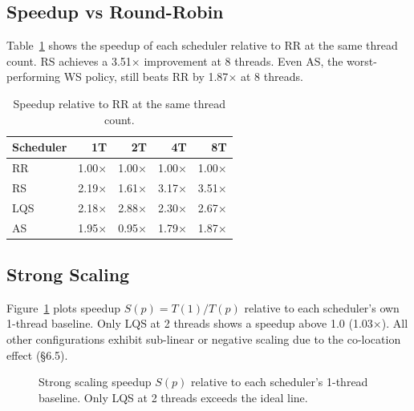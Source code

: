 \documentclass[conference]{IEEEtran}
\begin{document}
\subsection{Speedup vs Round-Robin}

Table~\ref{tab:speedup_rr} shows the speedup of each scheduler relative to RR at the same thread count. RS achieves a 3.51$\times$ improvement at 8 threads. Even AS, the worst-performing WS policy, still beats RR by 1.87$\times$ at 8 threads.

\begin{table}[htbp]
\centering
\caption{Speedup relative to RR at the same thread count.}
\label{tab:speedup_rr}
\begin{tabular}{lrrrr}
\toprule
Scheduler & 1T    & 2T    & 4T    & 8T    \\
\midrule
RR  & 1.00$\times$ & 1.00$\times$ & 1.00$\times$ & 1.00$\times$ \\
RS  & 2.19$\times$ & 1.61$\times$ & 3.17$\times$ & 3.51$\times$ \\
LQS & 2.18$\times$ & 2.88$\times$ & 2.30$\times$ & 2.67$\times$ \\
AS  & 1.95$\times$ & 0.95$\times$ & 1.79$\times$ & 1.87$\times$ \\
\bottomrule
\end{tabular}
\end{table}

\subsection{Strong Scaling}

Figure~\ref{fig:strong} plots speedup $S(p) = T(1)/T(p)$ relative to each scheduler's own 1-thread baseline. Only LQS at 2 threads shows a speedup above 1.0 (1.03$\times$). All other configurations exhibit sub-linear or negative scaling due to the co-location effect (\S6.5).

\begin{figure}[htbp]
\centering
{}
\caption{Strong scaling speedup $S(p)$ relative to each scheduler's 1-thread baseline. Only LQS at 2 threads exceeds the ideal line.}
\label{fig:strong}
\end{figure}
\end{document}
